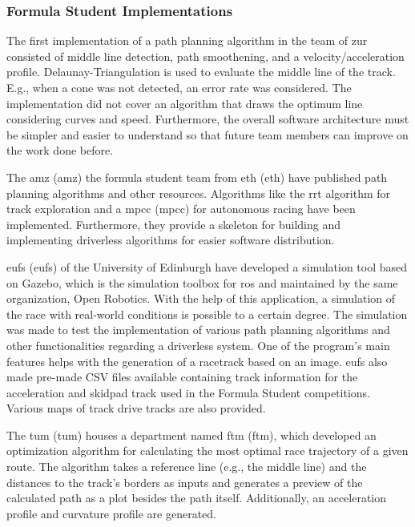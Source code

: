 \subsubsection{Formula Student Implementations} \label{sec:Formula Student Implementations}
The first implementation of a path planning algorithm in the team of \acrlong{zur} consisted of middle line detection, path smoothening, and a velocity/acceleration profile. Delaunay-Triangulation is used to evaluate the middle line of the track. E.g., when a cone was not detected, an error rate was considered. The implementation did not cover an algorithm that draws the optimum line considering curves and speed. Furthermore, the overall software architecture must be simpler and easier to understand so that future team members can improve on the work done before.
\cite{autopilot_for_formula_student_jerome}

The \acrshort{amz} (\acrlong{amz}) the formula student team from \acrshort{eth} (\acrlong{eth}) have published path planning algorithms and other resources. Algorithms like the \acrshort{rrt} algorithm for track exploration and a \acrlong{mpcc} (\acrshort{mpcc}) for autonomous racing have been implemented. Furthermore, they provide a skeleton for building and implementing driverless algorithms for easier software distribution.
\cite{amz_racing_github}

\acrlong{eufs} (\acrshort{eufs}) of the University of Edinburgh have developed a simulation tool based on Gazebo, which is the simulation toolbox for \acrshort{ros} and maintained by the same organization, Open Robotics. With the help of this application, a simulation of the race with real-world conditions is possible to a certain degree. The simulation was made to test the implementation of various path planning algorithms and other functionalities regarding a driverless system. One of the program's main features helps with the generation of a racetrack based on an image. \acrshort{eufs} also made pre-made CSV files available containing track information for the acceleration and skidpad track used in the Formula Student competitions. Various maps of track drive tracks are also provided.
\cite{eufs_sim_gitlab}

The \acrlong{tum} (\acrshort{tum}) houses a department named \acrlong{ftm} (\acrshort{ftm}), which developed an optimization algorithm for calculating the most optimal race trajectory of a given route. The algorithm takes a reference line (e.g., the middle line) and the distances to the track's borders as inputs and generates a preview of the calculated path as a plot besides the path itself. Additionally, an acceleration profile and curvature profile are generated.
\cite{tumftm_optimization_algoritm}

